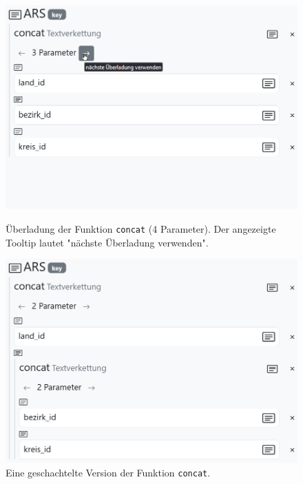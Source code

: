 \begin{figure}[!ht]
  \includegraphics[width=\linewidth]{assets/concat-overload.png}
  \caption{Überladung der Funktion \texttt{concat} (4 Parameter). Der angezeigte Tooltip lautet "nächste Überladung verwenden".}
  \label{fig:concat-overload}
  \endminipage
  \hfill
  \includegraphics[width=\linewidth]{assets/concat-nested.png}
  \caption{Eine geschachtelte Version der Funktion \texttt{concat}.}
  \label{fig:concat-nested}
  \endminipage
\end{figure}

